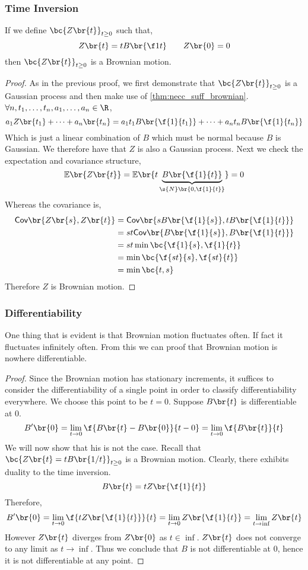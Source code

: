 \documentclass{article}
\newcommand{\Cov}{\textsf{Cov}}
\newcommand{\Exp}{\mathbb{E}}
\begin{document}
    \subsubsection{Time Inversion}
    If we define $\bc{Z\br{t}}_{t \geq 0}$ such that,
    \[ Z\br{t} = t B\br{\f1t} \qquad Z\br{0} = 0 \]
    then $\bc{Z\br{t}}_{t \geq 0}$ is a Brownian motion.
    \begin{proof}
        As in the previous proof, we first demonstrate that $\bc{Z\br{t}}_{t \geq 0}$ is a Gaussian process and then make use of \cref{thm:necc_suff_brownian}.\\

        $\forall n, t_1, \ldots, t_n, a_1, \ldots, a_n \in \R$,
        \[ a_1 Z\br{t_1} + \cdots + a_n\br{t_n} = a_1 t_1 B\br{\f{1}{t_1}} + \cdots + a_n t_n B\br{\f{1}{t_n}} \]
        Which is just a linear combination of $B$ which must be normal because $B$ is Gaussian. We therefore have that $Z$ is also a Gaussian process. Next we check the expectation and covariance structure,
        \[ \Exp\br{Z\br{t}} = \Exp\br{t \underbrace{B\br{\f{1}{t}}}_{\s{N}\br{0, \f{1}{t}}}} = 0 \]
        Whereas the covariance is,
        \begin{align*}
            \Cov\br{Z\br{s}, Z\br{t}}
            &= \Cov\br{sB\br{\f{1}{s}}, tB\br{\f{1}{t}}} \\
            &= st \Cov\br{B\br{\f{1}{s}}, B\br{\f{1}{t}}} \\
            &= st \min\bc{\f{1}{s}, \f{1}{t}} \\
            &= \min\bc{\f{st}{s}, \f{st}{t}} \\
            &= \min\bc{t, s}
        \end{align*}
        Therefore $Z$ is Brownian motion.
    \end{proof}
    \subsubsection{Differentiability}
    One thing that is evident is that Brownian motion fluctuates often. If fact it fluctuates infinitely often. From this we can proof that Brownian motion is nowhere differentiable.
    \begin{proof}
        Since the Brownian motion has stationary increments, it suffices to consider the differentiability of a single point in order to classify differentiability everywhere. We choose this point to be $t=0$. Suppose $B\br{t}$ is differentiable at $0$.
        \[ B'\br{0} = \lim_{t \to 0} \f{B\br{t} - B\br{0}}{t - 0} = \lim_{t \to 0} \f{B\br{t}}{t} \]
        We will now show that his is not the case. Recall that $\bc{Z\br{t} = t B\br{1/t}}_{t \geq 0}$  is a Brownian motion. Clearly, there exhibits duality to the time inversion.
        \[ B\br{t} = t Z\br{\f{1}{t}} \]
        Therefore,
        \[ B'\br{0} = \lim_{t \to 0} \f{t Z\br{\f{1}{t}}}{t} = \lim_{t \to 0} Z\br{\f{1}{t}} = \lim_{t \to \inf} Z\br{t} \]
        However $Z\br{t}$ diverges from $Z\br{0}$ as $t \in \inf$. $Z\br{t}$ does not converge to any limit as $t \to \inf$. Thus we conclude that $B$ is not differentiable at $0$, hence it is not differentiable at any point.
    \end{proof}
\end{document}
